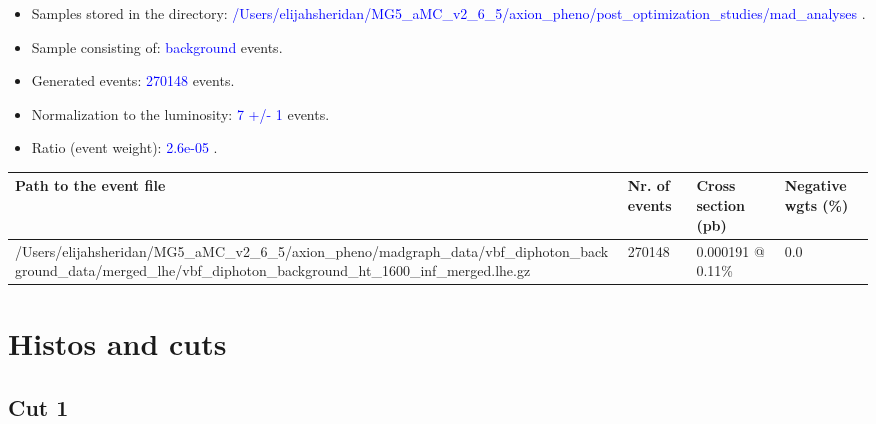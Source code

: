 \documentclass[a4paper, 10pt]{article}
\begin{document}
\begin{itemize}
  \item Samples stored in the directory: \textcolor{blue}{/\-Users/\-elijahsheridan/\-MG5\_aMC\_v2\_6\_5/\-axion\_pheno/\-post\_optimization\_studies/\-mad\_analyses} .
   \item Sample consisting of: \textcolor{blue}{background}  events.
   \item Generated events: \textcolor{blue}{270148 }  events.
   \item Normalization to the luminosity: \textcolor{blue}{7}\textcolor{blue}{ +/\-- }\textcolor{blue}{1 }  events.
   \item Ratio (event weight): \textcolor{blue}{2.6e-05 } .  
 
\end{itemize}
\begin{table}[H]
  \begin{center}
    \begin{tabular}{|m{55.0mm}|m{25.0mm}|m{30.0mm}|m{30.0mm}|}
      \hline
      {\cellcolor{yellow}         Path to the event file}& {\cellcolor{yellow}         Nr. of events}& {\cellcolor{yellow}         Cross section (pb)}& {\cellcolor{yellow}         Negative wgts (\%)}\\
      \hline
      {\cellcolor{white}          /\-Users/\-elijahsheridan/\-MG5\_aMC\_v2\_6\_5/\-axion\_pheno/\-madgraph\_data/\-vbf\_diphoton\_background\_data/\-merged\_lhe/\-vbf\_diphoton\_background\_ht\_1600\_inf\_merged.lhe.gz}& {\cellcolor{white}          270148}& {\cellcolor{white}          0.000191 @ 0.11\%}& {\cellcolor{white}          0.0}\\
\hline
    \end{tabular}
  \end{center}
\end{table}

\newpage
\section{ Histos and cuts}

\subsection{Cut 1}
\end{document}
